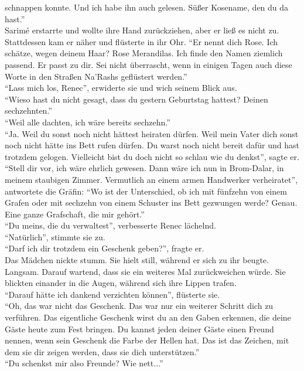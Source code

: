 schnappen konnte. Und ich habe ihn auch gelesen. Süßer Kosename, den du da hast.''\\
Sarimé erstarrte und wollte ihre Hand zurückziehen, aber er ließ es nicht zu. Stattdessen kam er 
näher und flüsterte in ihr Ohr. ``Er nennt dich Rose. Ich schätze, wegen deinem Haar? Rose 
Merandilas. Ich finde den Namen ziemlich passend. Er passt zu dir. Sei nicht überrascht, wenn in 
einigen Tagen auch diese Worte in den Straßen Na'Rashs geflüstert werden.''\\
``Lass mich los, Renec'', erwiderte sie und wich seinem Blick aus.\\
``Wieso hast du nicht gesagt, dass du gestern Geburtstag hattest? Deinen sechzehnten.''\\
``Weil alle dachten, ich wäre bereits sechzehn.''\\
``Ja. Weil du sonst noch nicht hättest heiraten dürfen. Weil mein Vater dich sonst noch nicht hätte 
ins Bett rufen dürfen. Du warst noch nicht bereit dafür und hast trotzdem gelogen. Vielleicht bist 
du doch nicht so schlau wie du denkst'', sagte er.\\
``Stell dir vor, ich wäre ehrlich gewesen. Dann wäre ich nun in Brom-Dalar, in meinem staubigen 
Zimmer. Vermutlich an einem armen Handwerker verheiratet'', antwortete die Gräfin: ``Wo ist der 
Unterschied, ob ich mit fünfzehn von einem Grafen oder mit sechzehn von einem Schuster ins Bett 
gezwungen werde? Genau. Eine ganze Grafschaft, die mir gehört.''\\
``Du meins, die du verwaltest'', verbesserte Renec lächelnd.\\
``Natürlich'', stimmte sie zu.\\
``Darf ich dir trotzdem ein Geschenk geben?'', fragte er.\\
Das Mädchen nickte stumm. Sie hielt still, während er sich zu ihr beugte. Langsam. Darauf 
wartend, dass sie ein weiteres Mal zurückweichen würde. Sie blickten einander in die Augen, während 
sich ihre Lippen trafen.\\
``Darauf hätte ich dankend verzichten können'', flüsterte sie.\\
``Oh, das war nicht das Geschenk. Das war nur ein weiterer Schritt dich zu verführen. Das 
eigentliche Geschenk wirst du an den Gaben erkennen, die deine Gäste heute zum Fest bringen. Du 
kannst jeden deiner Gäste einen Freund nennen, wenn sein Geschenk die Farbe der Hellen hat. Das ist 
das Zeichen, mit dem sie dir zeigen werden, dass sie dich unterstützen.''\\
``Du schenkst mir also Freunde? Wie nett...''\\
